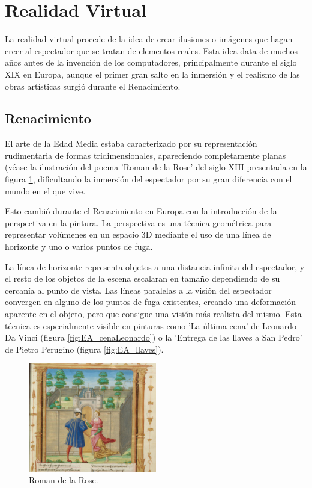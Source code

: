 \section{Realidad Virtual}

La realidad virtual procede de la idea de crear ilusiones o imágenes que hagan creer al espectador que se tratan de elementos reales. Esta idea data de muchos años antes de la invención de los computadores, principalmente durante el siglo XIX en Europa, aunque el primer gran salto en la inmersión y el realismo de las obras artísticas surgió durante el Renacimiento.




\subsection{Renacimiento}

El arte de la Edad Media estaba caracterizado por su representación rudimentaria de formas tridimensionales, apareciendo completamente planas (véase la ilustración del poema 'Roman de la Rose' del siglo XIII presentada en la figura \ref{fig:EA_roman}, dificultando la inmersión del espectador por su gran diferencia con el mundo en el que vive.

Esto cambió durante el Renacimiento en Europa con la introducción de la perspectiva en la pintura. La perspectiva es una técnica geométrica para representar volúmenes en un espacio 3D mediante el uso de una línea de horizonte y uno o varios puntos de fuga.

La línea de horizonte representa objetos a una distancia infinita del espectador, y el resto de los objetos de la escena escalaran en tamaño dependiendo de su cercanía al punto de vista. Las líneas paralelas a la visión del espectador convergen en alguno de los puntos de fuga existentes, creando una deformación aparente en el objeto, pero que consigue una visión más realista del mismo. Esta técnica es especialmente visible en pinturas como 'La última cena' de Leonardo Da Vinci (figura \ref{fig:EA_cenaLeonardo}) o la 'Entrega de las llaves a San Pedro' de Pietro Perugino (figura \ref{fig:EA_llaves}).



\begin{figure}
  \centering
\includegraphics[width=0.5\textwidth]{03.EstudioProblema/01.EstadoArte/00.Figuras/09.renacimiento_roman_rose.jpg}
    \caption{Roman de la Rose. \cite{EA_img_roman}}
    \label{fig:EA_roman}
\end{figure}



